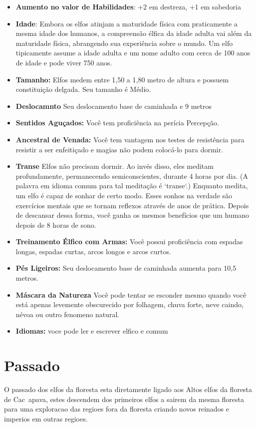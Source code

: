 \documentclass{book}
\begin{document}
\begin{itemize}
    \item \textbf{Aumento no valor de Habilidades}: +2 em destreza, +1 em sabedoria 
    \item \textbf{Idade}: Embora os elfos atinjam a maturidade física com praticamente a mesma 
          idade dos humanos, a compreensão élfica da idade adulta vai além da maturidade 
          física, abrangendo sua experiência sobre o mundo. Um elfo tipicamente assume 
          a idade adulta e um nome adulto com cerca de 100 anos de idade e pode viver
          750 anos.
    \item \textbf{Tamanho:} Elfos medem entre 1,50 a 1,80 metro de altura e possuem 
          constituição delgada. Seu tamanho é Médio.
    \item \textbf{Deslocamnto} Seu deslocamento base de caminhada e 9 metros
       \item \textbf{Sentidos Aguçados:} Você tem proficiência na perícia Percepção.
    \item \textbf{Ancestral de Venada:} Você tem vantagem nos testes de resistência para 
          resistir  a ser enfeitiçado e magias não podem colocá-lo para dormir.
    \item \textbf{Transe} Elfos não precisam dormir. Ao invés disso, eles meditam 
          profundamente, permanecendo semiconscientes, durante 4 horas por 
          dia. (A palavra em idioma comum para tal meditação é `transe`.) Enquanto
          medita, um elfo é capaz de sonhar de certo modo. Esses sonhos na verdade 
          são exercícios mentais que se tornam reflexos através de anos de prática.
          Depois de descansar dessa forma, você ganha os mesmos benefícios que um
          humano depois de 8 horas de sono.
    \item \textbf{Treinamento Élfico com Armas:} Você possui proficiência com espadas 
          longas, espadas curtas, arcos longos e arcos curtos.
    \item \textbf{Pés Ligeiros:} Seu deslocamento base de caminhada aumenta para 10,5 metros.

    \item \textbf{Máscara da Natureza} Você pode tentar se esconder mesmo quando você está
          apenas levemente obscurecido por folhagem, chuva forte, neve caindo, névoa ou 
          outro fenomeno natural.
    \item \textbf{Idiomas:} voce pode ler e escrever elfico e comum 
\end{itemize} 
\section{Passado}
O passado dos elfos da floresta esta diretamente ligado aos Altos elfos da floresta de 
Cac~apava, estes descendem dos primeiros elfos a sairem da mesma floresta para uma exploracao
das regioes fora da floresta criando novos reinados e imperios em outras regioes.
\end{document}
